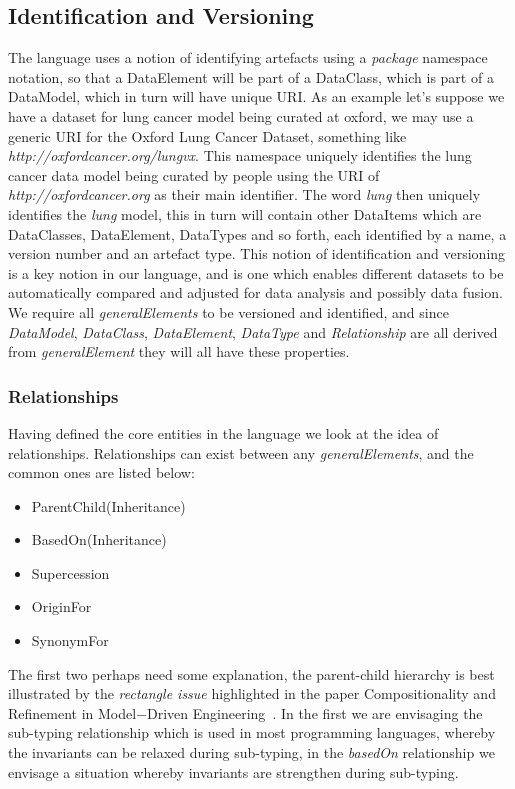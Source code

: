 \documentclass{llncs}
\begin{document}
	\subsection{Identification and Versioning}
	The language uses a notion of identifying artefacts using a \emph{package} namespace notation, so that a DataElement will be part of a DataClass, which is part of a DataModel, which in turn will have unique URI. As an example let's suppose we have a dataset for lung cancer model being curated at oxford, we may use a generic URI for the Oxford Lung Cancer Dataset, something like \emph{http://oxfordcancer.org/lungvx}. This namespace uniquely identifies the lung cancer data model being curated by people using the URI of \emph{http://oxfordcancer.org} as their main identifier. The word \emph{lung} then uniquely identifies the \emph{lung} model, this in turn will contain other DataItems which are DataClasses, DataElement, DataTypes and so forth, each identified by a name, a version number and an artefact type.
	This notion of identification and versioning is a key notion in our language, and is one which enables different datasets to be automatically compared and adjusted for data analysis and possibly data fusion. We require all \emph{generalElements} to be versioned and identified, and since \emph{DataModel}, \emph{DataClass}, \emph{DataElement}, \emph{DataType} and \emph{Relationship} are all derived from \emph{generalElement} they will all have these properties. 
	
	\subsubsection{Relationships}
	
	Having defined the core entities in the language we look at the idea of relationships. Relationships can exist between any \emph{generalElements}, and the common ones are listed below:
	
	\begin{itemize}
		\item ParentChild(Inheritance)
		\item BasedOn(Inheritance)
		\item Supercession
		\item OriginFor
		\item SynonymFor
	\end{itemize}
	
	The first two perhaps need some explanation, the parent-child hierarchy is best illustrated by the \emph{rectangle issue} highlighted in the paper Compositionality and Refinement in Model−Driven Engineering~\cite{SBMF2012}. In the first we are envisaging the sub-typing relationship which is used in most programming languages, whereby the invariants can be relaxed during sub-typing, in the \emph{basedOn} relationship we envisage a situation whereby invariants are strengthen during sub-typing.
	
\end{document}
